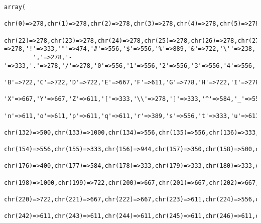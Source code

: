 \footnotesize\begin{verbatim}array(
        chr(0)=>278,chr(1)=>278,chr(2)=>278,chr(3)=>278,chr(4)=>278,chr(5)=>278,chr(6)=>278,chr(7)=>278,chr(8)=>278,chr(9)=>278,chr(10)=>278,chr(11)=>278,chr(12)=>278,chr(13)=>278,chr(14)=>278,chr(15)=>278,chr(16)=>278,chr(17)=>278,chr(18)=>278,chr(19)=>278,chr(20)=>278,chr(21)=>278,
        chr(22)=>278,chr(23)=>278,chr(24)=>278,chr(25)=>278,chr(26)=>278,chr(27)=>278,chr(28)=>278,chr(29)=>278,chr(30)=>278,chr(31)=>278, =>278,'!'=>333,'"'=>474,'#'=>556,'$'=>556,'%'=>889,'&'=>722,'\''=>238,'('=>333,')'=>333,'*'=>389,'+'=>584,
        ','=>278,'-'=>333,'.'=>278,'/'=>278,'0'=>556,'1'=>556,'2'=>556,'3'=>556,'4'=>556,'5'=>556,'6'=>556,'7'=>556,'8'=>556,'9'=>556,':'=>333,';'=>333,'<'=>584,'='=>584,'>'=>584,'?'=>611,'@'=>975,'A'=>722,
        'B'=>722,'C'=>722,'D'=>722,'E'=>667,'F'=>611,'G'=>778,'H'=>722,'I'=>278,'J'=>556,'K'=>722,'L'=>611,'M'=>833,'N'=>722,'O'=>778,'P'=>667,'Q'=>778,'R'=>722,'S'=>667,'T'=>611,'U'=>722,'V'=>667,'W'=>944,
        'X'=>667,'Y'=>667,'Z'=>611,'['=>333,'\\'=>278,']'=>333,'^'=>584,'_'=>556,'`'=>333,'a'=>556,'b'=>611,'c'=>556,'d'=>611,'e'=>556,'f'=>333,'g'=>611,'h'=>611,'i'=>278,'j'=>278,'k'=>556,'l'=>278,'m'=>889,
        'n'=>611,'o'=>611,'p'=>611,'q'=>611,'r'=>389,'s'=>556,'t'=>333,'u'=>611,'v'=>556,'w'=>778,'x'=>556,'y'=>556,'z'=>500,'{'=>389,'|'=>280,'}'=>389,'~'=>584,chr(127)=>350,chr(128)=>556,chr(129)=>350,chr(130)=>278,chr(131)=>556,
        chr(132)=>500,chr(133)=>1000,chr(134)=>556,chr(135)=>556,chr(136)=>333,chr(137)=>1000,chr(138)=>667,chr(139)=>333,chr(140)=>1000,chr(141)=>350,chr(142)=>611,chr(143)=>350,chr(144)=>350,chr(145)=>278,chr(146)=>278,chr(147)=>500,chr(148)=>500,chr(149)=>350,chr(150)=>556,chr(151)=>1000,chr(152)=>333,chr(153)=>1000,
        chr(154)=>556,chr(155)=>333,chr(156)=>944,chr(157)=>350,chr(158)=>500,chr(159)=>667,chr(160)=>278,chr(161)=>333,chr(162)=>556,chr(163)=>556,chr(164)=>556,chr(165)=>556,chr(166)=>280,chr(167)=>556,chr(168)=>333,chr(169)=>737,chr(170)=>370,chr(171)=>556,chr(172)=>584,chr(173)=>333,chr(174)=>737,chr(175)=>333,
        chr(176)=>400,chr(177)=>584,chr(178)=>333,chr(179)=>333,chr(180)=>333,chr(181)=>611,chr(182)=>556,chr(183)=>278,chr(184)=>333,chr(185)=>333,chr(186)=>365,chr(187)=>556,chr(188)=>834,chr(189)=>834,chr(190)=>834,chr(191)=>611,chr(192)=>722,chr(193)=>722,chr(194)=>722,chr(195)=>722,chr(196)=>722,chr(197)=>722,
        chr(198)=>1000,chr(199)=>722,chr(200)=>667,chr(201)=>667,chr(202)=>667,chr(203)=>667,chr(204)=>278,chr(205)=>278,chr(206)=>278,chr(207)=>278,chr(208)=>722,chr(209)=>722,chr(210)=>778,chr(211)=>778,chr(212)=>778,chr(213)=>778,chr(214)=>778,chr(215)=>584,chr(216)=>778,chr(217)=>722,chr(218)=>722,chr(219)=>722,
        chr(220)=>722,chr(221)=>667,chr(222)=>667,chr(223)=>611,chr(224)=>556,chr(225)=>556,chr(226)=>556,chr(227)=>556,chr(228)=>556,chr(229)=>556,chr(230)=>889,chr(231)=>556,chr(232)=>556,chr(233)=>556,chr(234)=>556,chr(235)=>556,chr(236)=>278,chr(237)=>278,chr(238)=>278,chr(239)=>278,chr(240)=>611,chr(241)=>611,
        chr(242)=>611,chr(243)=>611,chr(244)=>611,chr(245)=>611,chr(246)=>611,chr(247)=>584,chr(248)=>611,chr(249)=>611,chr(250)=>611,chr(251)=>611,chr(252)=>611,chr(253)=>556,chr(254)=>611,chr(255)=>556)
\end{verbatim}\normalsize 
